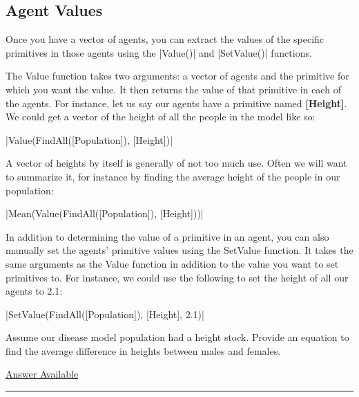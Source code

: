 \documentclass[]{memoir}
\newcommand{\FloatTok}[1]{\textcolor[rgb]{0.25,0.63,0.44}{{#1}}}
\newcommand{\FunctionTok}[1]{\textcolor[rgb]{0.02,0.16,0.49}{{#1}}}
\newcommand{\NormalTok}[1]{{#1}}
\newcommand{\p}[1]{\textbf{{[}#1{]}}}
\begin{document}
\subsection{Agent Values}

Once you have a vector of agents, you can extract the values of the
specific primitives in those agents using the
|\FunctionTok{Value}\NormalTok{()}| and
|\FunctionTok{SetValue}\NormalTok{()}| functions.

The Value function takes two arguments: a vector of agents and the
primitive for which you want the value. It then returns the value of
that primitive in each of the agents. For instance, let us say our
agents have a primitive named \p{Height}. We could get a vector of the
height of all the people in the model like so:

|\FunctionTok{Value}\NormalTok{(}\FunctionTok{FindAll}\NormalTok{([Population]), [Height])}|

A vector of heights by itself is generally of not too much use. Often we
will want to summarize it, for instance by finding the average height of
the people in our population:

|\FunctionTok{Mean}\NormalTok{(}\FunctionTok{Value}\NormalTok{(}\FunctionTok{FindAll}\NormalTok{([Population]), [Height]))}|

In addition to determining the value of a primitive in an agent, you can
also manually set the agents' primitive values using the SetValue
function. It takes the same arguments as the Value function in addition
to the value you want to set primitives to. For instance, we could use
the following to set the height of all our agents to 2.1:

|\FunctionTok{SetValue}\NormalTok{(}\FunctionTok{FindAll}\NormalTok{([Population]), [Height], }\FloatTok{2.1}\NormalTok{)}|


Assume our disease model population had a height stock. Provide an
equation to find the average difference in heights between males and
females.

\hyperref[Ans-13-10]{Answer Available}

\begin{center}\rule{3in}{0.4pt}\end{center}

\FloatBarrier 
\end{document}
